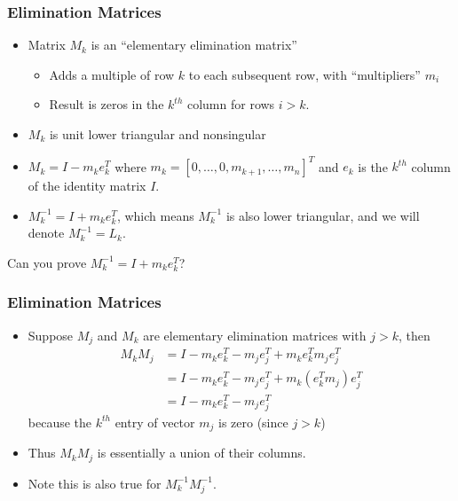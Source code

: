 \documentclass[10pt]{beamer}
\begin{document}
\begin{frame}\frametitle{Elimination Matrices}
\begin{itemize}
  \item Matrix $M_k$ is an ``elementary elimination matrix''
    \begin{itemize}
        \item Adds a multiple of row $k$ to each subsequent row, with ``multipliers'' $m_i$ 
        \item Result is zeros in the $k^{th}$ column for rows $i>k$.
    \end{itemize}
  \item $M_k$ is unit lower triangular and nonsingular
  \item $M_k = I - m_k e_k^T$ where $m_k = [0,\dots,0,m_{k+1},\dots,m_n]^T$ and
$e_k$ is the $k^{th}$ column of the identity matrix $I$.

  \item $M^{-1}_k = I + m_k e_k^T$, which means $M_k^{-1}$ is also lower triangular, and we will denote $M_k^{-1} = L_k$.
\end{itemize}
\begin{alertblock}{}
Can you prove $M^{-1}_k = I + m_k e_k^T$?
\end{alertblock}
\end{frame}
\begin{frame}\frametitle{Elimination Matrices}
\begin{itemize}
    \item Suppose $M_j$ and $M_k$ are elementary elimination matrices with $j>k$,
    then
    \begin{align*}
      M_k M_j & = I - m_k e_k^T - m_j e_j^T + m_k e_k^T m_j e_j^T\\
    & = I - m_k e_k^T - m_j e_j^T + m_k (e_k^T m_j) e_j^T\\
    & = I - m_k e_k^T - m_j e_j^T
    \end{align*}
    because the $k^{th}$ entry of vector $m_j$ is zero (since $j>k$)
    \item Thus $M_k M_j$ is essentially a union of their columns.
    \item Note this is also true for $M_k^{-1}M_j^{-1}$.
\end{itemize}
\end{frame}
\end{document}
